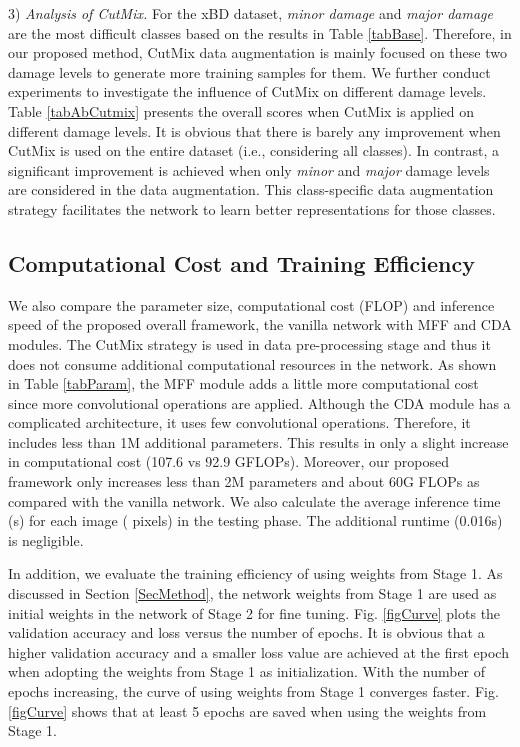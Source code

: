 \documentclass[journal]{IEEEtran}
\begin{document}
3) \textit{Analysis of CutMix.}
For the xBD dataset, \textit{minor damage} and \textit{major damage} are the most difficult classes based on the results in Table \ref{tabBase}. Therefore, in our proposed method, CutMix data augmentation is mainly focused on these two damage levels to generate more training samples for them. We further conduct experiments to investigate the influence of CutMix on different damage levels. Table \ref{tabAbCutmix} presents the overall scores when CutMix is applied on different damage levels. It is obvious that there is barely any improvement when CutMix is used on the entire dataset (i.e., considering all classes). In contrast, a significant improvement is achieved when only \textit{minor} and \textit{major} damage levels are considered in the data augmentation. This class-specific data augmentation strategy facilitates the network to learn better representations for those classes. 

\subsection{Computational Cost and Training Efficiency}
We also compare the parameter size, computational cost (FLOP) and inference speed of the proposed overall framework, the vanilla network with MFF and CDA modules. The CutMix strategy is used in data pre-processing stage and thus it does not consume additional computational resources in the network.   
As shown in Table \ref{tabParam}, the MFF module adds a little more computational cost since more convolutional operations are applied. Although the CDA module has a complicated architecture, it uses few convolutional operations. Therefore, it includes less than 1M additional parameters.  This results in only a slight increase in computational cost (107.6 vs 92.9 GFLOPs). Moreover, our proposed framework only increases less than 2M parameters and about 60G FLOPs as compared with the vanilla network.  We also calculate the average inference time (s) for each image ( pixels) in the testing phase. The additional runtime (0.016s) is negligible. 


In addition, we evaluate the training efficiency of using weights from Stage 1. As discussed in Section \ref{SecMethod}, the network weights from Stage 1 are used as initial weights in the network of Stage 2 for fine tuning. Fig. \ref{figCurve} plots the validation accuracy and loss versus the number of epochs. It is obvious that a higher validation accuracy and a smaller loss value are achieved at the first epoch when adopting the weights from Stage 1 as initialization. With the number of epochs increasing, the curve of using weights from Stage 1 converges faster. Fig. \ref{figCurve} shows that at least 5 epochs are saved when using the weights from Stage 1.
\end{document}
